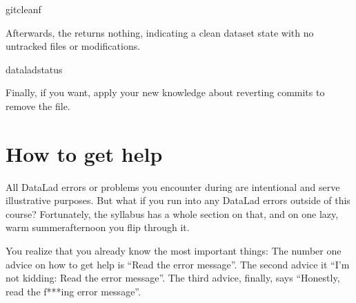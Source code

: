 \begin{sphinxVerbatim}[commandchars=\\\{\}]
gitclean\PYGZhy{}f
\end{sphinxVerbatim}

\sphinxAtStartPar
Afterwards, the  returns nothing, indicating a
clean dataset state with no untracked files or modifications.

\begin{sphinxVerbatim}[commandchars=\\\{\}]
dataladstatus
\end{sphinxVerbatim}

\sphinxAtStartPar
Finally, if you want, apply your new knowledge about reverting commits
to remove the  file.

\sphinxstepscope


\section{How to get help}
\label{\detokenize{basics/101-135-help:how-to-get-help}}\label{\detokenize{basics/101-135-help:help}}\label{\detokenize{basics/101-135-help::doc}}
\sphinxAtStartPar
All DataLad errors or problems you encounter during  are intentional
and serve illustrative purposes. But what if you run into any DataLad errors
outside of this course?
Fortunately, the syllabus has a whole section on that, and on
one lazy, warm summer\sphinxhyphen{}afternoon you flip through it.

\begin{figure}[tbp]
\centering

\noindent{}
\end{figure}

\sphinxAtStartPar
You realize that you already know the most important things:
The number one advice on how to get help is
“Read the error message”.
The second advice it
“I’m not kidding: Read the error message”.
The third advice, finally, says
“Honestly, read the f***ing error message”.


